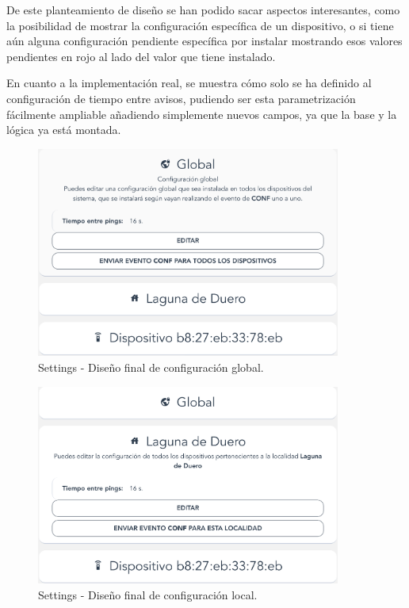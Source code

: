 \begin{enumerate}
    De este planteamiento de diseño se han podido sacar aspectos interesantes, como la posibilidad de mostrar la configuración específica de un dispositivo, o si tiene aún alguna configuración pendiente específica por instalar mostrando esos valores pendientes en rojo al lado del valor que tiene instalado.
    
    En cuanto a la implementación real, se muestra cómo solo se ha definido al configuración de tiempo entre avisos, pudiendo ser esta parametrización fácilmente ampliable añadiendo simplemente nuevos campos, ya que la base y la lógica ya está montada.
    
    \begin{figure}[H]   
        \centering
        \includegraphics[width=10cm]{./img/web2/settings.global.png}
        \caption{Settings - Diseño final de configuración global.}
        \label{fig:set.global}
    \end{figure}
    
    \begin{figure}[H]   
        \centering
        \includegraphics[width=10cm]{./img/web2/settings.location.png}
        \caption{Settings - Diseño final de configuración local.}
        \label{fig:set.local}
    \end{figure}
    

\end{enumerate}
